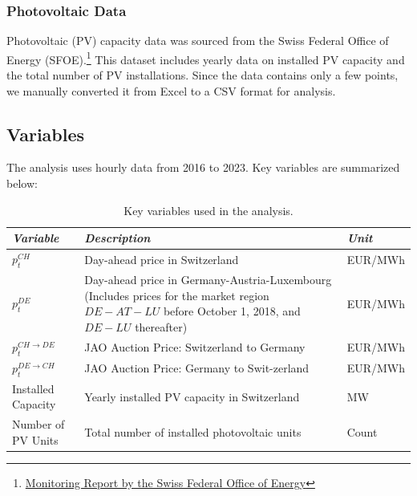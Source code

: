\documentclass[12pt]{article}
\begin{document}
\subsubsection*{Photovoltaic Data}

Photovoltaic (PV) capacity data was sourced from the Swiss Federal Office of Energy (SFOE).\footnote{\href{https://www.bfe.admin.ch/bfe/de/home/versorgung/statistik-und-geodaten/monitoring-energiestrategie-2050.exturl.html/aHR0cHM6Ly9wdWJkYi5iZmUuYWRtaW4uY2gvZGUvcHVibGljYX/Rpb24vZG93bmxvYWQvMTAzMjI=.html}{Monitoring Report by the Swiss Federal Office of Energy}} This dataset includes yearly data on installed PV capacity and the total number of PV installations. Since the data contains only a few points, we manually converted it from Excel to a CSV format for analysis.

\subsection{Variables}

The analysis uses hourly data from 2016 to 2023. Key variables are summarized below:
\begin{table}[ht]
    \footnotesize
    \centering
    \begin{tabular}{|l|p{6cm}|l|}
        \hline
        \textit{Variable} & \textit{Description} & \textit{Unit} \\ \hline
        \( p_t^{CH} \) & Day-ahead price in Switzerland & EUR/MWh \\ \hline
        \( p_t^{DE} \) & Day-ahead price in Germany-Austria-Luxembourg (Includes prices for the market region \( DE-AT-LU \) before October 1, 2018, and \( DE-LU \) thereafter) & EUR/MWh \\ \hline
        \( p_t^{CH \rightarrow DE} \) & JAO Auction Price: Switzerland to Germany & EUR/MWh \\ \hline
        \( p_t^{DE\rightarrow CH} \) & JAO Auction Price: Germany to Swit-zerland & EUR/MWh \\ \hline
        Installed Capacity & Yearly installed PV capacity in Switzerland & MW \\ \hline
        Number of PV Units & Total number of installed photovoltaic units & Count \\ \hline
    \end{tabular}
    \caption{Key variables used in the analysis.}
\end{table}
\end{document}
